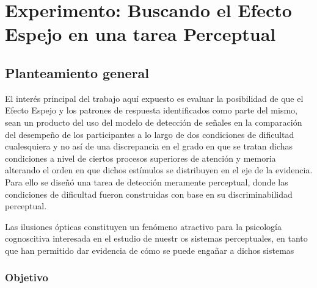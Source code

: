 
\chapter{Experimento: Buscando el Efecto Espejo en una tarea Perceptual} %

\label{Cap_Exp} %

\section{Planteamiento general}



El interés principal del trabajo aquí expuesto es evaluar la posibilidad de que el Efecto Espejo y los patrones de respuesta identificados como parte del mismo, sean un producto del uso del modelo de detección de señales en la comparación del desempeño de los participantes a lo largo de dos condiciones de dificultad cualesquiera y no así de una discrepancia en el grado en que se tratan dichas condiciones a nivel de ciertos procesos superiores de atención y memoria alterando el orden en que dichos estímulos se distribuyen en el eje de la evidencia. Para ello se diseñó una tarea de detección meramente perceptual, donde las condiciones de dificultad fueron construidas con base en su discriminabilidad perceptual. 

Las ilusiones ópticas constituyen un fenómeno atractivo para la psicología cognoscitiva interesada en el estudio de nuestr os sistemas perceptuales, en tanto que han permitido dar evidencia de cómo se puede engañar a dichos sistemas 


\subsection{Objetivo}

